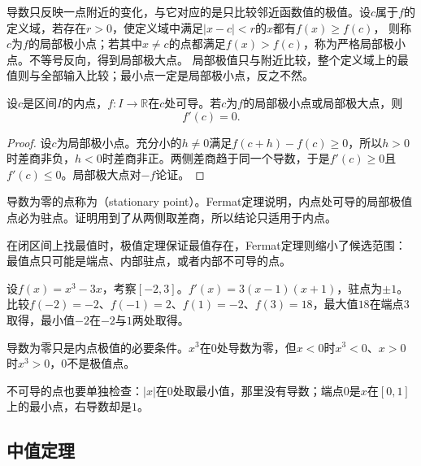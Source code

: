 导数只反映一点附近的变化，与它对应的是只比较邻近函数值的极值。设$c$属于$f$的定义域，若存在$r>0$，使定义域中满足$|x-c|<r$的$x$都有$f(x)\geq f(c)$，
则称$c$为$f$的局部极小点；若其中$x\neq c$的点都满足$f(x)>f(c)$，称为严格局部极小点。不等号反向，得到局部极大点。
局部极值只与附近比较，整个定义域上的最值则与全部输入比较；最小点一定是局部极小点，反之不然。
\begin{theorem}[Fermat定理]
\label{thm:analysis-fermat}
设$c$是区间$I$的内点，$f:I\to\mathbb R$在$c$处可导。若$c$为$f$的局部极小点或局部极大点，则
\begin{equation}
 f'(c)=0.
 \label{eq:analysis-scalar-first-order-necessary}
\end{equation}
\end{theorem}
\begin{proof}
设$c$为局部极小点。充分小的$h\neq0$满足$f(c+h)-f(c)\geq0$，所以$h>0$时差商非负，$h<0$时差商非正。两侧差商趋于同一个导数，于是$f'(c)\geq0$且$f'(c)\leq0$。局部极大点对$-f$论证。
\end{proof}
导数为零的点称为（stationary point）。Fermat定理说明，内点处可导的局部极值点必为驻点。证明用到了从两侧取差商，所以结论只适用于内点。

在闭区间上找最值时，极值定理保证最值存在，Fermat定理则缩小了候选范围：最值点只可能是端点、内部驻点，或者内部不可导的点。
\begin{example}[三次多项式在闭区间上的最值]
\label{ex:ru-cubic-extrema-interval}
设$f(x)=x^3-3x$，考察$[-2,3]$。$f'(x)=3(x-1)(x+1)$，驻点为$\pm1$。比较$f(-2)=-2$、$f(-1)=2$、$f(1)=-2$、$f(3)=18$，最大值$18$在端点$3$取得，最小值$-2$在$-2$与$1$两处取得。
\end{example}

导数为零只是内点极值的必要条件。$x^3$在$0$处导数为零，但$x<0$时$x^3<0$、$x>0$时$x^3>0$，$0$不是极值点。

不可导的点也要单独检查：$|x|$在$0$处取最小值，那里没有导数；端点$0$是$x$在$[0,1]$上的最小点，右导数却是$1$。

\subsection{中值定理}
\label{sec:ru-mean-value-theorems}

